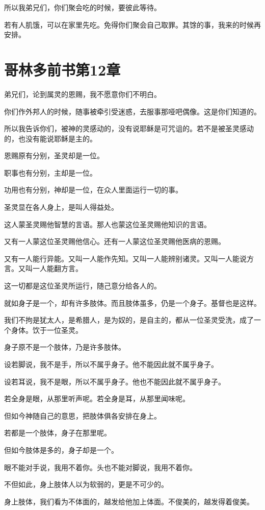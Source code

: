 \documentclass[12pt,oneside]{book}
\begin{document}
所以我弟兄们，你们聚会吃的时候，要彼此等待。

若有人肌饿，可以在家里先吃。免得你们聚会自己取罪。其馀的事，我来的时候再安排。

\chapter{哥林多前书第12章}
弟兄们，论到属灵的恩赐，我不愿意你们不明白。

你们作外邦人的时候，随事被牵引受迷惑，去服事那哑吧偶像。这是你们知道的。

所以我告诉你们，被神的灵感动的，没有说耶稣是可咒诅的。若不是被圣灵感动的，也没有能说耶稣是主的。

恩赐原有分别，圣灵却是一位。

职事也有分别，主却是一位。

功用也有分别，神却是一位，在众人里面运行一切的事。

圣灵显在各人身上，是叫人得益处。

这人蒙圣灵赐他智慧的言语。那人也蒙这位圣灵赐他知识的言语。

又有一人蒙这位圣灵赐他信心。还有一人蒙这位圣灵赐他医病的恩赐。

又有一人能行异能。又叫一人能作先知。又叫一人能辨别诸灵。又叫一人能说方言。又叫一人能翻方言。

这一切都是这位圣灵所运行，随己意分给各人的。

就如身子是一个，却有许多肢体。而且肢体虽多，仍是一个身子。基督也是这样。

我们不拘是犹太人，是希腊人，是为奴的，是自主的，都从一位圣灵受洗，成了一个身体。饮于一位圣灵。

身子原不是一个肢体，乃是许多肢体。

设若脚说，我不是手，所以不属乎身子。他不能因此就不属乎身子。

设若耳说，我不是眼，所以不属乎身子。他也不能因此就不属乎身子。

若全身是眼，从那里听声呢。若全身是耳，从那里闻味呢。

但如今神随自己的意思，把肢体俱各安排在身上。

若都是一个肢体，身子在那里呢。

但如今肢体是多的，身子却是一个。

眼不能对手说，我用不着你。头也不能对脚说，我用不着你。

不但如此，身上肢体人以为软弱的，更是不可少的。

身上肢体，我们看为不体面的，越发给他加上体面。不俊美的，越发得着俊美。
\end{document}
